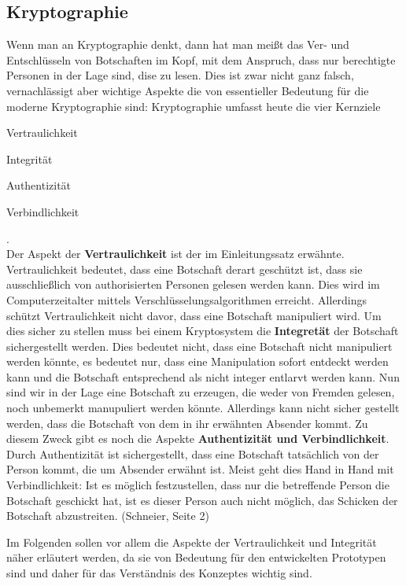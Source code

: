 \documentclass[12pt,a4paper,bibliography=totocnumbered,listof=totocnumbered]{scrartcl}
\begin{document}
\subsection{Kryptographie}
Wenn man an Kryptographie denkt, dann hat man meißt das Ver- und Entschlüsseln von Botschaften im Kopf, mit dem Anspruch, dass nur berechtigte Personen in der Lage sind, dise zu lesen. Dies ist zwar nicht ganz falsch, vernachlässigt aber wichtige Aspekte die von essentieller Bedeutung für die moderne Kryptographie sind: Kryptographie umfasst heute die vier Kernziele
\begin{compactitem}
	\item Vertraulichkeit
	\item Integrität
	\item Authentizität
	\item Verbindlichkeit
\end{compactitem}
.\\Der Aspekt der \textbf{Vertraulichkeit} ist der im Einleitungssatz erwähnte. Vertraulichkeit bedeutet, dass eine Botschaft derart geschützt ist, dass sie ausschließlich von authorisierten Personen gelesen werden kann. Dies wird im Computerzeitalter mittels Verschlüsselungsalgorithmen erreicht. Allerdings schützt Vertraulichkeit nicht davor, dass eine Botschaft manipuliert wird. Um dies sicher zu stellen muss bei einem Kryptosystem die \textbf{Integretät} der Botschaft sichergestellt werden. Dies bedeutet nicht, dass eine Botschaft nicht manipuliert werden könnte, es bedeutet nur, dass eine Manipulation sofort entdeckt werden kann und die Botschaft entsprechend als nicht integer entlarvt werden kann. Nun sind wir in der Lage eine Botschaft zu erzeugen, die weder von Fremden gelesen, noch unbemerkt manupuliert werden könnte. Allerdings kann nicht sicher gestellt werden, dass die Botschaft von dem in ihr erwähnten Absender kommt. Zu diesem Zweck gibt es noch die Aspekte \textbf{Authentizität und Verbindlichkeit}. Durch Authentizität ist sichergestellt, dass eine Botschaft tatsächlich von der Person kommt, die um Absender erwähnt ist. Meist geht dies Hand in Hand mit Verbindlichkeit: Ist es möglich festzustellen, dass nur die betreffende Person die Botschaft geschickt hat, ist es dieser Person auch nicht möglich, das Schicken der Botschaft abzustreiten. (Schneier, Seite 2)

Im Folgenden sollen vor allem die Aspekte der Vertraulichkeit und Integrität näher erläutert werden, da sie von Bedeutung für den entwickelten Prototypen sind und daher für das Verständnis des Konzeptes wichtig sind.
\end{document}
